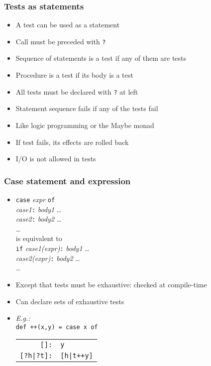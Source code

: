 \documentclass[12pt]{beamer}
\begin{document}
\begin{frame}[fragile]
\frametitle{Tests as statements}
\begin{itemize}
\item A test can be used as a statement
\item Call must be preceded with \texttt{?}
\item Sequence of statements is a test if any of them are tests
\item Procedure is a test if its body is a test
\item All tests must be declared with \texttt{?} at left
\item Statement sequence fails if any of the tests fail
\item Like logic programming or the Maybe monad
\item If test fails, its effects are rolled back
\item I/O is not allowed in tests
\end{itemize}
\end{frame}


\begin{frame}[fragile]
\frametitle{Case statement and expression}
\begin{itemize}
\item \texttt{case} \emph{expr} \texttt{of} \\
\hspace*{1em} \emph{case1}\texttt{:} \emph{body1} \ldots \\
\hspace*{1em} \emph{case2}\texttt{:} \emph{body2} \ldots \\
\hspace*{1em} \ldots \\[2ex]
is equivalent to \\[2ex]
 \texttt{if} \emph{case1(expr)}\texttt{:} \emph{body1} \ldots \\
\hspace*{1em} \emph{case2(expr)}\texttt{:} \emph{body2} \ldots \\
\hspace*{1em} \ldots
\item Except that tests must be exhaustive: checked at compile-time
\item Can declare sets of exhaustive tests
\item \emph{E.g.:}\\
  \texttt{def ++(x,y) = case x of} \\
\hspace*{3em}
\begin{tabular}{rl}
\texttt{[]:} & \texttt{y}\\
\texttt{[?h|?t]:} & \texttt{[h|t++y]}\\
\end{tabular}
\end{itemize}
\end{frame}
\end{document}
